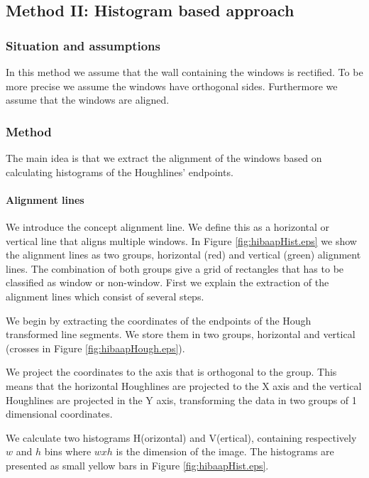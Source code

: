 \subsection{Method II: Histogram based approach} 
\subsubsection{Situation and assumptions}
In this method we assume that the wall containing the windows is rectified.
To be more precise we assume the windows have orthogonal sides.
Furthermore we assume that the windows are aligned.

\subsubsection{Method}
The main idea is that we extract the alignment of the windows based on
calculating histograms of the Houghlines' endpoints.

\paragraph{Alignment lines}
We introduce the concept alignment line. We define this as a horizontal or
vertical line that aligns multiple windows. In Figure
\ref{fig:hibaapHist.eps}
we show the alignment lines as two groups, horizontal (red) and
vertical (green) alignment lines.  The combination of both groups give a grid of
rectangles that has to be classified as window or non-window.
First we explain the extraction of the alignment lines which consist of several
steps.

We begin by extracting the coordinates of the endpoints of the Hough transformed line
segments. We store them in two groups, horizontal and vertical (crosses in Figure
\ref{fig:hibaapHough.eps}). 


We project the coordinates to the axis that is orthogonal to the group. This means
that the horizontal Houghlines are projected to the X axis and the vertical
Houghlines are projected in the Y axis, transforming the data in two groups of 1
dimensional coordinates.

We calculate two histograms H(orizontal) and V(ertical), containing respectively
$w$ and $h$ bins where $w x h$ is the dimension of the image.  The histograms
are presented as small yellow bars in Figure \ref{fig:hibaapHist.eps}.


